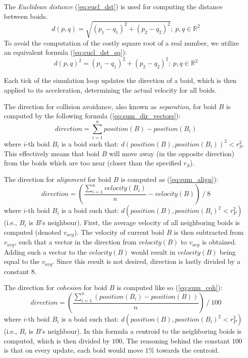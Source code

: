 \documentclass[9pt]{pnas-new}
\begin{document}
\noindent The {\em Euclidean distance} (\ref{eq:eucl_dst}) is used for computing the distance between boids.
\begin{equation} \label{eq:eucl_dst}
	d(p, q) = \sqrt{(p_1-q_1)^2 + (p_2 - q_2)^2};\  p, q \in \mathbb{R}^2
\end{equation}
To avoid the computation of the costly square root of a real number, we utilize an equivalent formula
(\ref{eq:eucl_dst_sq}):
\begin{equation} \label{eq:eucl_dst_sq}
	d(p, q)^2 = (p_1-q_1)^2 + (p_2 - q_2)^2;\  p, q \in \mathbb{R}^2
\end{equation}

Each tick of the simulation loop updates the direction of a boid, which is then applied to its acceleration,
determining the actual velocity for all boids.

The direction for collision avoidance, also known as {\em separation}, for boid $B$ is computed by the
following formula (\ref{eq:sum_dir_vectors}):
\begin{equation} \label{eq:sum_dir_vectors}
	direction = \sum_{i=1}^{n} position(B) - position(B_i)
\end{equation}
where $i$-th boid $B_i$ is a boid such that: $ d(position(B), position(B_i))^2 < r_S^2 $.
This effectively means that boid $B$ will move away (in the opposite direction) from the boids which are too near (closer than the specified $r_S$).

The direction for {\em alignment} for boid $B$ is computed as (\ref{eq:sum_align}):
\begin{equation} \label{eq:sum_align}
	direction = \left( \frac{\sum_{i=1}^{n} velocity(B_i)}{n} - velocity(B) \right) \mathbin{/} 8
\end{equation}
where $i$-th boid $B_i$ is a boid such that: $ d(position(B), position(B_i)^2 < r_P^2) $ (i.e., $B_i$ is $B$'s neighbour).
First, the average velocity of all neighboring boids is computed (denoted $v_{avg}$).
The velocity of current boid $B$ is then subtracted from $v_{avg}$, such that a vector in the direction
from $velocity(B)$ to $v_{avg}$ is obtained.
Adding such a vector to the $velocity(B)$ would result in $velocity(B)$ being equal to the $v_{avg}$.
Since this result is not desired, direction is lastly divided by a constant $8$.

The direction for {\em cohesion} for boid $B$ is computed like so (\ref{eq:sum_coh}):
\begin{equation} \label{eq:sum_coh}
	direction = \left( \frac{\sum_{i=1}^{n} \left(position(B_i) - position(B)\right)}{n} \right) \mathbin{/} 100
\end{equation}
where $i$-th boid $B_i$ is a boid such that: $ d(position(B), position(B_i)^2 < r_P^2) $ (i.e., $B_i$ is $B$'s neighbour).
In this formula a centroid to the neighboring boids is computed, which is then divided by $100$.
The reasoning behind the constant $100$ is that on every update, each boid would move $1\%$ towards the centroid.
\end{document}
